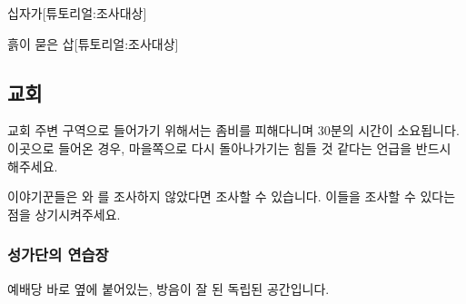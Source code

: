 \documentclass{report}
\begin{document}
					\begin{spoiler}{십자가}{[튜토리얼:조사대상]}
					\end{spoiler}
					
					\begin{spoiler}{흙이 묻은 삽}{[튜토리얼:조사대상]}
					\end{spoiler}
				
			\subsection{교회}
				교회 주변 구역으로 들어가기 위해서는 좀비를 피해다니며 30분의 시간이 소요됩니다. 이곳으로 들어온 경우, 마을쪽으로 다시 돌아나가기는 힘들 것 같다는 언급을 반드시 해주세요.
				
				이야기꾼들은 와 를 조사하지 않았다면 조사할 수 있습니다. 이들을 조사할 수 있다는 점을 상기시켜주세요.
				
				\hypertarget{search:choir-practice}{}
				\subsubsection*{성가단의 연습장}
					예배당 바로 옆에 붙어있는, 방음이 잘 된 독립된 공간입니다.
					
\end{document}
